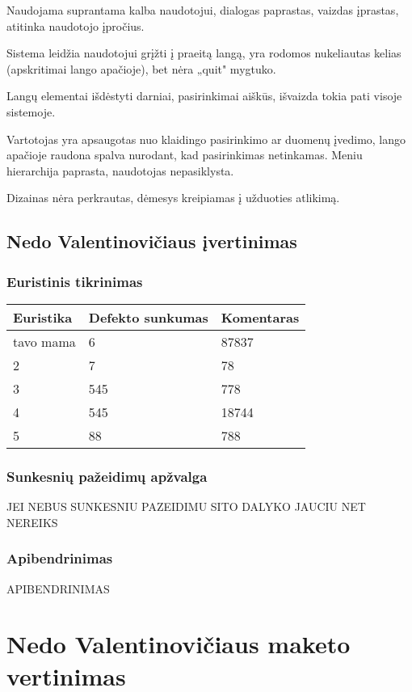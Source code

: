 \documentclass{VUMIFPSkursinis}
\begin{document}
Naudojama suprantama kalba naudotojui, dialogas paprastas, vaizdas įprastas, atitinka naudotojo įpročius.

Sistema leidžia naudotojui grįžti į praeitą langą, yra rodomos nukeliautas kelias (apskritimai lango apačioje), bet nėra „quit" mygtuko.

Langų elementai išdėstyti darniai, pasirinkimai aiškūs, išvaizda tokia pati visoje sistemoje.

Vartotojas yra apsaugotas nuo klaidingo pasirinkimo ar duomenų įvedimo, lango apačioje raudona spalva nurodant, kad pasirinkimas netinkamas. Meniu hierarchija paprasta, naudotojas nepasiklysta.

Dizainas nėra perkrautas, dėmesys kreipiamas į užduoties atlikimą.

\subsection{Nedo Valentinovičiaus įvertinimas}
\subsubsection{Euristinis tikrinimas}
\begin{center}
 \begin{tabular}{|| p{4cm} | p{4cm} | p{8cm} ||} 
 \hline
 Euristika & Defekto sunkumas & Komentaras \\
 \hline\hline
 tavo mama & 6 & 87837 \\ 
 \hline
 2 & 7 & 78 \\
 \hline
 3 & 545 & 778 \\
 \hline
 4 & 545 & 18744 \\
 \hline
 5 & 88 & 788 \\  %
 \hline                 %
\end{tabular}	
\end{center}

\subsubsection{Sunkesnių pažeidimų apžvalga}
JEI NEBUS SUNKESNIU PAZEIDIMU SITO DALYKO JAUCIU NET NEREIKS

\subsubsection{Apibendrinimas}
APIBENDRINIMAS

\section{Nedo Valentinovičiaus maketo vertinimas}
\end{document}
